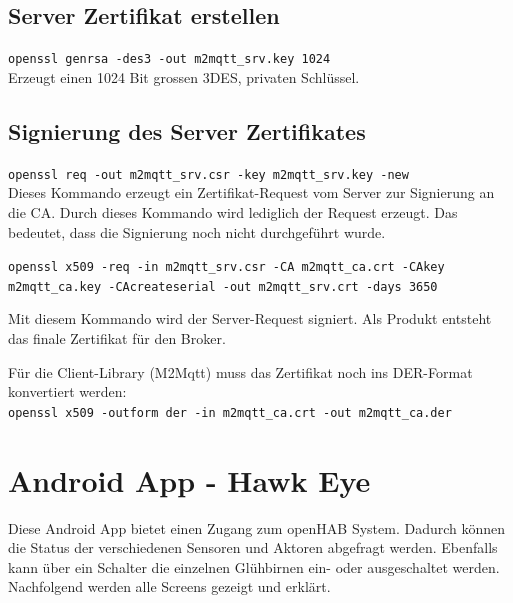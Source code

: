 \subsection*{Server Zertifikat erstellen}
\lstinline!openssl genrsa -des3 -out m2mqtt_srv.key 1024! \\
Erzeugt einen 1024 Bit grossen 3DES, privaten Schlüssel. 

\subsection*{Signierung des Server Zertifikates}
\lstinline!openssl req -out m2mqtt_srv.csr -key m2mqtt_srv.key -new! \\
Dieses Kommando erzeugt ein Zertifikat-Request vom Server zur Signierung an die CA. Durch dieses Kommando wird lediglich der Request erzeugt. Das bedeutet, dass die Signierung noch nicht durchgeführt wurde.

\lstinline!openssl x509 -req -in m2mqtt_srv.csr -CA m2mqtt_ca.crt -CAkey m2mqtt_ca.key -CAcreateserial -out m2mqtt_srv.crt -days 3650!

Mit diesem Kommando wird der Server-Request signiert. Als Produkt entsteht das finale Zertifikat für den Broker.

Für die Client-Library (M2Mqtt) muss das Zertifikat noch ins DER-Format konvertiert werden: \\
\lstinline!openssl x509 -outform der -in m2mqtt_ca.crt -out m2mqtt_ca.der!

\pagebreak
\section*{Android App - Hawk Eye}
\label{sec:manualAndroidApp}
Diese Android App bietet einen Zugang zum openHAB System. Dadurch können die Status der verschiedenen Sensoren und Aktoren abgefragt werden. Ebenfalls kann über ein Schalter die einzelnen Glühbirnen ein- oder ausgeschaltet werden. Nachfolgend werden alle Screens gezeigt und erklärt.

